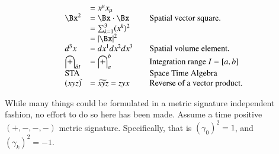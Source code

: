 \documentclass{article}
\begin{document}
\begin{equation*}
\begin{array}{l l l}
    &= x^\mu x_\mu \\
\Bx^2 &= \Bx \cdot \Bx & \quad \mbox{Spatial vector square. } \\
    &= \sum_{k=1}^3 (x^k)^2 \\
    &= \Abs{\Bx}^2 \\
d^3 x &= dx^1 dx^2 dx^3 & \quad \mbox{Spatial volume element. } \\
\int_{\partial I} &= \int_{a}^{b} & \quad \mbox{Integration range $I = [a,b]$ } \\
\text{STA} & & \quad \mbox{Space Time Algebra} \\
(xyz)^{\tilde{}} &= \widetilde{xyz} = z y x & \quad \mbox{Reverse of a vector product.} \\
\end{array}
\end{equation*}

While many things could be formulated in a metric signature independent fashion, no effort to do so here has been made.  Assume
a time positive
$(+,-,-,-)$
metric signature.  Specifically, that is $(\gamma_0)^2 = 1$, and $(\gamma_k)^2 = -1$.  


%



\end{document}
